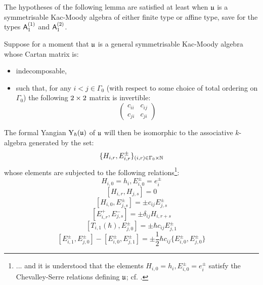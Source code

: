         The hypotheses of the following lemma are satisfied at least when $\mathfrak{u}$ is a symmetrisable Kac-Moody algebra of either finite type or affine type, save for the types $\mathsf{A}_1^{(1)}$ and $\mathsf{A}_1^{(2)}$.
        \begin{lemma} \label{lemma: levendorskii_presentation_for_yangians_of_symmetrisable_kac_moody_algebras}
            \cite[Theorem 2.13]{guay_nakajima_wendlandt_affine_yangian_coproduct} Suppose for a moment that $\mathfrak{u}$ is a general symmetrisable Kac-Moody algebra whose Cartan matrix is:
            \begin{itemize}
                \item indecomposable,
                \item such that, for any $i < j \in \Gamma_0$ (with respect to some choice of total ordering on $\Gamma_0$) the following $2 \x 2$ matrix is invertible:
                    $$
                        \begin{pmatrix}
                            c_{ii} & c_{ij}
                            \\
                            c_{ji} & c_{ji}
                        \end{pmatrix}
                    $$
            \end{itemize}
            The formal Yangian $\mathrm{Y}_{\hbar}(\mathfrak{u})$ of $\mathfrak{u}$ will then be isomorphic to the associative $k$-algebra generated by the set:
                $$\{ H_{i, r}, E_{i, r}^{\pm} \}_{(i, r) \in \Gamma_0 \x \N}$$
            whose elements are subjected to the following relations\footnote{... and it is understood that the elements $H_{i, 0} = h_i, E_{i, 0}^{\pm} = e_i^{\pm}$ satisfy the Chevalley-Serre relations defining $\mathfrak{u}$; cf. \cite[Chapter 1]{kac_infinite_dimensional_lie_algebras}.}:
                $$H_{i, 0} = h_i, E_{i, 0}^{\pm} = e_i^{\pm}$$
                $$[ H_{i, r}, H_{j, s} ] = 0$$
                $$[ H_{i, 0}, E_{j, s}^{\pm} ] = \pm c_{ij} E_{j, s}^{\pm}$$
                $$[ E_{i, r}^+, E_{j, s}^- ] = \pm \delta_{ij} H_{i, r + s}$$
                $$\left[ T_{i, 1}(\hbar), E_{j, 0}^{\pm} \right] = \pm \hbar c_{ij} E_{j, 1}^{\pm}$$
                $$[ E_{i, 1}^{\pm}, E_{j, 0}^{\pm} ] - [ E_{i, 0}^{\pm}, E_{j, 1}^{\pm} ] = \pm \frac12 \hbar c_{ij} \{E_{i, 0}^{\pm}, E_{j, 0}^{\pm}\}$$
        \end{lemma}
